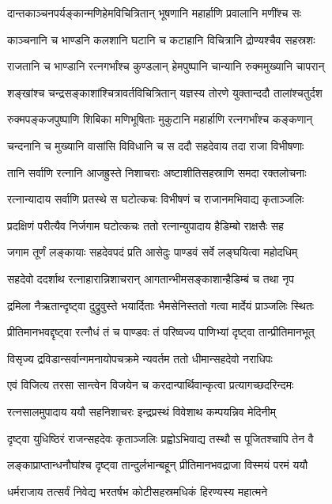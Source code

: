 \twolineshloka
{दान्तकाञ्चनपर्यङ्कान्मणिहेमविचित्रितान्}
{भूषणानि महार्हाणि प्रवालानि मणींश्च सः}


\twolineshloka
{काञ्चनानि च भाण्डनि कलशानि घटानि च}
{कटाहानि विचित्रानि द्रोण्यश्चैव सहस्रशः}


\threelineshloka
{राजतानि च भाण्डानि रत्नगर्भांश्च कुण्डलान्}
{हेमपुष्पानि चान्यानि रुक्ममुख्यानि चापरान्}
{}


\twolineshloka
{शङ्खांश्च चन्द्रसङ्काशांश्चित्रावर्तविचित्रितान्}
{यज्ञस्य तोरणे युक्तान्ददौ तालांश्चतुर्दश}


\twolineshloka
{रुक्मपङ्कजपुष्पाणि शिबिका मणिभूषिताः}
{मुकुटानि महार्हाणि रत्नगर्भांश्च कङ्कणान्}


\twolineshloka
{चन्दनानि च मुख्यानि वासांसि विविधानि च}
{स ददौ सहदेवाय तदा राजा विभीषणाः}


\twolineshloka
{तानि सर्वाणि रत्नानि आजह्रुस्ते निशाचराः}
{अष्टाशीतिसहस्राणि समदा रक्तलोचनाः}


\twolineshloka
{रत्नान्यादाय सर्वाणि प्रतस्थे स घटोत्कचः}
{विभीषणं च राजानमभिवाद्य कृताञ्जलिः}


\twolineshloka
{प्रदक्षिणं परीत्यैव निर्जगाम घटोत्कचः}
{ततो रत्नान्युपादाय हैडिम्बो राक्षसैः सह}


\twolineshloka
{जगाम तूर्णं लङ्कायाः सहदेवपदं प्रति}
{आसेदुः पाण्डवं सर्वे लङ्घयित्वा महोदधिम्}


\twolineshloka
{सहदेवो ददर्शाथ रत्नाहारान्निशाचरान्}
{आगतान्भीमसङ्काशान्हैडिम्बं च तथा नृप}


\twolineshloka
{द्रमिला नैऋतान्दृष्ट्वा दुद्रुवुस्ते भयार्दिताः}
{भैमसेनिस्ततो गत्वा मार्देयं प्राञ्जलिः स्थितः}


\twolineshloka
{प्रीतिमानभवद्दृष्ट्वा रत्नौधं तं च पाण्डवः}
{तं परिष्वज्य पाणिभ्यां दृष्ट्वा तान्प्रीतिमानभूत्}


\twolineshloka
{विसृज्य द्रविडान्सर्वान्गमनायोपचक्रमे}
{न्यवर्तम ततो धीमान्सहदेवो नराधिपः}


\twolineshloka
{एवं विजित्य तरसा सान्त्वेन विजयेन च}
{करदान्पार्थिवान्कृत्वा प्रत्यागच्छदरिन्दमः}


\twolineshloka
{रत्नसालमुपादाय ययौ सहनिशाचरः}
{इन्द्रप्रस्थं विवेशाथ कम्पयन्निव मेदिनीम्}


\twolineshloka
{दृष्ट्वा युधिष्ठिरं राजन्सहदेवः कृताञ्जलिः}
{प्रह्वोऽभिवाद्य तस्थौ स पूजितश्चापि तेन वै}


\twolineshloka
{लङ्काप्राप्तान्धनौघांश्च दृष्ट्वा तान्दुर्लभान्बहून्}
{प्रीतिमानभवद्राजा विस्मयं परमं ययौ}


\twolineshloka
{धर्मराजाय तत्सर्वं निवेद्य भरतर्षभ}
{कोटीसहस्रमधिकं हिरण्यस्य महात्मने}


